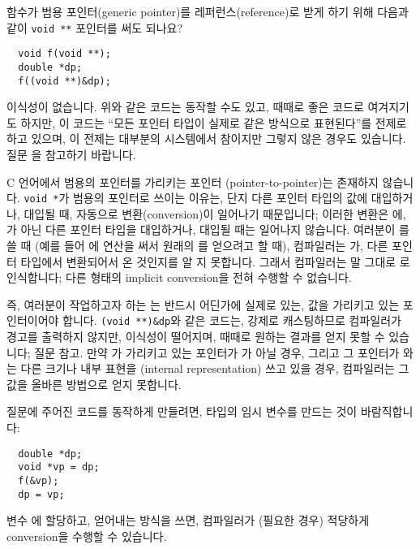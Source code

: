 \begin{faq}
	함수가 범용 포인터(generic pointer)를 레퍼런스(reference)로 받게
	하기 위해 다음과 같이 \verb+void **+ 포인터를 써도 되나요?
\begin{verbatim}
  void f(void **);
  double *dp;
  f((void **)&dp);
\end{verbatim}

\A
	이식성이 없습니다.  위와 같은 코드는 동작할 수도 있고, 때때로 좋은 코드로
        여겨지기도 하지만, 이 코드는 ``모든 포인터 타입이 실제로 같은 방식으로 표현된다''를
        전제로 하고 있으며, 이 전제는 대부분의 시스템에서 참이지만 그렇지 않은 경우도 있습니다.
        질문 을 참고하기 바랍니다.
        
        C 언어에서 범용의 포인터를 가리키는 포인터
	(pointer-to-pointer)는 존재하지 않습니다.  \verb+void *+가 범용의
	포인터로 쓰이는 이유는, 단지 다른 포인터 타입의 값에 대입하거나,
        대입될 때, 자동으로 변환(conversion)이 일어나기 때문입니다; 
        이러한 변환은 에, 가 아닌 다른 포인터
        타입을 대입하거나, 대입될 때는 일어나지 않습니다.
        여러분이 를 쓸 때 (예를 들어 에
        \TT{*} 연산을 써서 원래의 를 얻으려고 할 때),
        컴파일러는 가, 다른 포인터 타입에서
        변환되어서 온 것인지를 알 지 못합니다. 그래서 컴파일러는 말
        그대로 로 인식합니다; 다른 형태의 implicit conversion을
        전혀 수행할 수 없습니다.

        즉, 여러분이 작업하고자 하는 는 반드시
        어딘가에 실제로 있는,  값을 가리키고 있는 포인터이어야
        합니다. \verb+(void **)&dp+와 같은 코드는,
        강제로 캐스팅하므로 컴파일러가 경고를 출력하지 않지만,
        이식성이 떨어지며, 때때로 원하는 결과를 얻지 못할 수 있습니다;
        질문  참고. 만약 가 가리키고
        있는 포인터가 가 아닐 경우, 그리고 그 포인터가
        와는 다른 크기나 내부 표현을 (internal representation)
        쓰고 있을 경우, 컴파일러는 그 값을
        올바른 방법으로 얻지 못합니다.

        질문에 주어진 코드를 동작하게 만들려면,  타입의
        임시 변수를 만드는 것이 바람직합니다:
\begin{verbatim}
  double *dp;
  void *vp = dp;
  f(&vp);
  dp = vp;
\end{verbatim}
        변수 에 할당하고, 얻어내는 방식을 쓰면, 컴파일러가 (필요한 경우) 적당하게
        conversion을 수행할 수 있습니다.


\end{faq}
